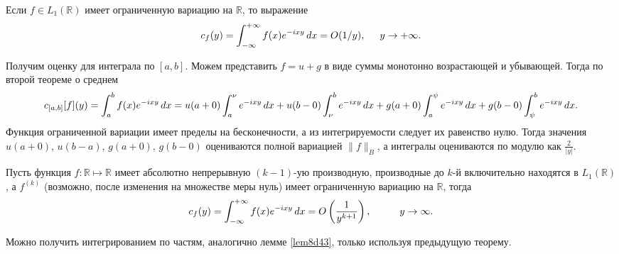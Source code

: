 

\begin{to_thr}[]
    Если $f \in L_1 (\mathbb{R})$ имеет ограниченную вариацию на $\mathbb{R}$, то выражение
    \begin{equation*}
        c_f (y) = \int_{-\infty}^{+\infty} f(x) e^{-ixy} \, d x = O(1/y),
        \hspace{5 mm} y \to +\infty.
    \end{equation*}
\end{to_thr}

\begin{uproof}
    Получим оценку для интеграла по $[a, b]$. Можем представить $f = u + g$ в виде суммы монотонно возрастающей и убывающей. Тогда по второй теореме о среднем
    \begin{equation*}
        c_{[a, b]}[f](y) = \int_{a}^{b} f(x) e^{-ixy} \, d x = u(a+0) 
        \int_{a}^{\nu} e^{-ixy} \, d x + u(b-0) \int_{\nu}^{b} e^{-ixy} \, d x + 
        g(a+0) \int_{a}^{\psi} e^{-ixy} \, d x + g(b-0) \int_{\psi}^{b} e^{-ixy} \, d x.
    \end{equation*}
    Функция ограниченной вариации имеет пределы на бесконечности, а из интегрируемости следует их равенство нулю. Тогда значения $u(a+0),\, u(b-a),\, g(a+0),\, g(b-0)$ оцениваются полной вариацией $\|f\|_B$, а интегралы оцениваются по модулю как $\frac{2}{|y|}$. 
\end{uproof}




\begin{to_con}
    Пусть функция $f \colon \mathbb{R} \mapsto \mathbb{R}$ имеет абсолютно непрерывную $(k-1)$-ую производную, производные до $k$-й включительно находятся в $L_1 (\mathbb{R})$, а $f^{(k)}$ (возможно, после изменения на множестве меры нуль) имеет ограниченную вариацию на $\mathbb{R}$, тогда
    \begin{equation*}
        c_f (y) = \int_{-\infty}^{+\infty} 
        f(x) e^{-ixy} \, d x =
        O\left(\frac{1}{y^{k+1}}\right), 
        \hspace{1 cm}
        y \to \infty.
    \end{equation*}
\end{to_con}


\begin{uproof}
    Можно получить интегрированием по частям, аналогично лемме \ref{lem8d43}, только используя предыдущую теорему. 
\end{uproof}





